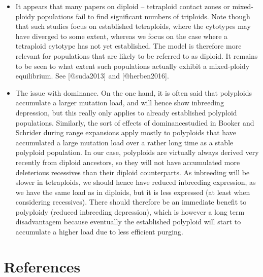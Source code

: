 \begin{itemize}
\item
  It appears that many papers on diploid -- tetraploid contact zones or
  mixed-ploidy populations fail to find significant numbers of
  triploids. Note though that such studies focus on established
  tetraploids, where the cytotypes may have diverged to some extent,
  whereas we focus on the case where a tetraploid cytotype has not yet
  established. The model is therefore more relevant for populations that
  are likely to be referred to as diploid. It remains to be seen to what
  extent such populations actually exhibit a mixed-ploidy equilibrium.
  See {[}@suda2013{]} and {[}@herben2016{]}.
\item
  The issue with dominance. On the one hand, it is often said that
  polyploids accumulate a larger mutation load, and will hence show
  inbreeding depression, but this really only applies to already
  established polyploid populations. Similarly, the sort of effects of
  dominancestudied in Booker and Schrider during range expansions apply
  mostly to polyploids that have accumulated a large mutation load over
  a rather long time as a stable polyploid population. In our case,
  polyploids are virtually always derived very recently from diploid
  ancestors, so they will not have accumulated more deleterious
  recessives than their diploid counterparts. As inbreeding will be
  slower in tetraploids, we should hence have reduced inbreeding
  expression, as we have the same load as in diploids, but it is less
  expressed (at least when considering recessives). There should
  therefore be an immediate benefit to polyploidy (reduced inbreeding
  depression), which is however a long term disadvantagem because
  eventually the established polyploid will start to accumulate a higher
  load due to less efficient purging.
\end{itemize}

\hypertarget{references}{%
\section{References}\label{references}}

\hypertarget{refs}{}
\begin{CSLReferences}{0}{0}
\end{CSLReferences}

\clearpage
\setcounter{page}{1}

\clearpage
\renewcommand{\thefigure}{S\arabic{figure}}
\renewcommand{\thesection}{S\arabic{section}}
\renewcommand{\theequation}{S\arabic{equation}}
\renewcommand{\thealgorithm}{S\arabic{algorithm}}
\setcounter{figure}{0}
\setcounter{section}{0}
\setcounter{equation}{0}
\setcounter{algorithm}{0}


